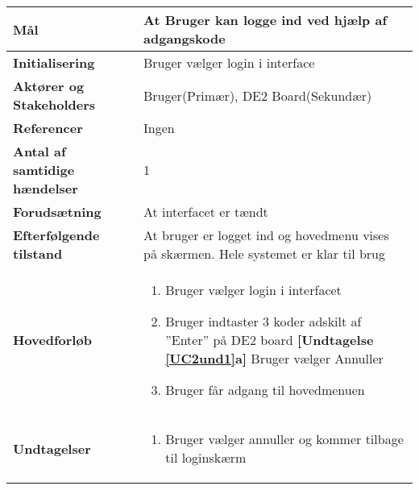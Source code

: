 \begin{table}[H] \centering
\begin{tabular}{|p{6cm}|p{8cm}|}
	\hline
\textbf{Mål}								
&At Bruger kan logge ind ved hjælp af adgangskode
 \\\hline
\textbf{Initialisering}					
&Bruger vælger login i interface
 \\\hline
\textbf{Aktører og Stakeholders}			
&Bruger(Primær), DE2 Board(Sekundær)
 \\\hline
\textbf{Referencer}						
&Ingen
 \\\hline
\textbf{Antal af samtidige hændelser}	
&1
 \\\hline
\textbf{Forudsætning}					
&At interfacet er tændt
 \\\hline
\textbf{Efterfølgende tilstand}			
&At bruger er logget ind og hovedmenu vises på skærmen. Hele systemet er klar til brug
 \\\hline
\textbf{Hovedforløb}						
& 
\begin{enumerate}

\item Bruger vælger login i interfacet

\item \label{UC2und1}Bruger indtaster 3 koder adskilt af ''Enter'' på DE2 board \newline
\textbf{[Undtagelse \ref{UC2und1}a]} Bruger vælger Annuller

\item Bruger får adgang til hovedmenuen	
 
\end{enumerate}
\\\hline

\textbf{Undtagelser}						
&\begin{enumerate}[label= \ref{UC2und1}a.]
			\item Bruger vælger annuller og kommer tilbage til loginskærm
		\end{enumerate}
\\\hline


	\end{tabular}
	\label{UC1} 
\end{table}